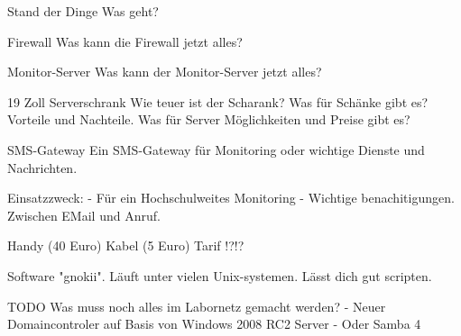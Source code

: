 \documentclass{beamer}
\author[J. Klemkow und B. Franzke]{Jan Klemkow und Benjamin Franzke}
\begin{document}
\begin{frame}{Stand der Dinge}
	Was geht?
\end{frame}

\begin{frame}{Firewall}
	Was kann die Firewall jetzt alles?
\end{frame}

\begin{frame}{Monitor-Server}
	Was kann der Monitor-Server jetzt alles?
\end{frame}

\begin{frame}{19 Zoll Serverschrank}
	Wie teuer ist der Scharank?
	Was für Schänke gibt es?
	Vorteile und Nachteile.
	Was für Server Möglichkeiten und Preise gibt es?
\end{frame}

\begin{frame}{SMS-Gateway}
	Ein SMS-Gateway für Monitoring oder wichtige Dienste und Nachrichten.

	Einsatzzweck:
		- Für ein Hochschulweites Monitoring
		- Wichtige benachitigungen. Zwischen EMail und Anruf.

	Handy (40 Euro)
	Kabel (5 Euro)
	Tarif !?!?

	Software "gnokii".
	Läuft unter vielen Unix-systemen.
	Lässt dich gut scripten.
\end{frame}

\begin{frame}{TODO}
	Was muss noch alles im Labornetz gemacht werden?
	- Neuer Domaincontroler auf Basis von Windows 2008 RC2 Server
	- Oder Samba 4
\end{frame}
\end{document}

